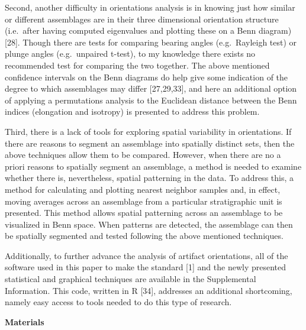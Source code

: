 \documentclass[]{article}
\begin{document}
Second, another difficulty in orientations analysis is in knowing just
how similar or different assemblages are in their three dimensional
orientation structure (i.e.~after having computed eigenvalues and
plotting these on a Benn diagram){[}28{]}. Though there are tests for
comparing bearing angles (e.g.~Rayleigh test) or plunge angles
(e.g.~unpaired t-test), to my knowledge there exists no recommended test
for comparing the two together. The above mentioned confidence intervals
on the Benn diagrams do help give some indication of the degree to which
assemblages may differ {[}27,29,33{]}, and here an additional option of
applying a permutations analysis to the Euclidean distance between the
Benn indices (elongation and isotropy) is presented to address this
problem.

Third, there is a lack of tools for exploring spatial variability in
orientations. If there are reasons to segment an assemblage into
spatially distinct sets, then the above techniques allow them to be
compared. However, when there are no a priori reasons to spatially
segment an assemblage, a method is needed to examine whether there is,
nevertheless, spatial patterning in the data. To address this, a method
for calculating and plotting nearest neighbor samples and, in effect,
moving averages across an assemblage from a particular stratigraphic
unit is presented. This method allows spatial patterning across an
assemblage to be visualized in Benn space. When patterns are detected,
the assemblage can then be spatially segmented and tested following the
above mentioned techniques.

Additionally, to further advance the analysis of artifact orientations,
all of the software used in this paper to make the standard {[}1{]} and
the newly presented statistical and graphical techniques are available
in the Supplemental Information. This code, written in R {[}34{]},
addresses an additional shortcoming, namely easy access to tools needed
to do this type of research.

\textbf{Materials}
\end{document}
